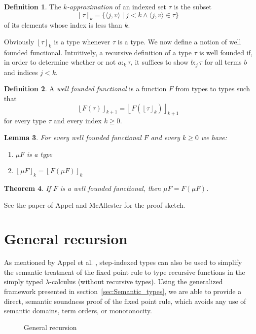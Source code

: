 \documentclass[10pt,a4paper,final,twocolumn]{article}
\theoremstyle{definition}
\newtheorem{definition}{Definition}
\theoremstyle{plain}
\newtheorem{lemma}[definition]{Lemma}
\newtheorem{theorem}[definition]{Theorem}
\newcommand{\app}[2]{\ensuremath{{#1}\,{#2}}}
\newcommand{\fix}[1]{\ensuremath{\mathsf{fix}\,{#1}}}
\newcommand{\pair}[1]{\ensuremath{\langle{#1}\rangle}}
\newcommand{\floor}[1]{\ensuremath{\left\lfloor{#1}\right\rfloor}}
\begin{document}
\begin{definition} \label{def:Approximation}
  The \emph{$k$-approximation} of an indexed set $\tau$ is the subset
  \[ \floor{\tau}_k = \{ \pair{j,v} \mid j < k \wedge \pair{j,v} \in \tau \} \]
  of its elements whose index is less than $k$.
\end{definition}

Obviously $\floor{\tau}_k$ is a type whenever $\tau$ is a type. We now define a notion of well founded
functional. Intuitively, a recursive definition of a type $\tau$ is well founded if, in order to determine
whether or not \mbox{$a :_k \tau$}, it suffices to show \mbox{$b :_j \tau$} for all terms $b$ and indices
\mbox{$j < k$}.

\begin{definition}
  A \emph{well founded functional} is a function $F$ from types to types such that
  \[\floor{F\left(\tau\right)}_{k+1} = \floor{F\left(\floor{\tau}_k\right)}_{k+1}\]
  for every type $\tau$ and every index $k \ge 0$.
\end{definition}

\begin{lemma}
  For every well founded functional $F$ and every $k \ge 0$ we have:
  \begin{enumerate}
  \item $\mu F$ is a type
  \item $\floor{\mu F}_k = \floor{F \left(\mu F\right)}_k$
  \end{enumerate}
\end{lemma}

\begin{theorem} \label{thm:Well_founded_fixpoint}
  If $F$ is a well founded functional, then $\mu F = F(\mu F)$.
\end{theorem}

See the paper of Appel and McAllester \cite{Appel01} for the proof sketch.


\section{General recursion}
\label{sec:General_recursion}


As mentioned by Appel et al. \cite{Appel01}, step-indexed types can also be used to simplify the semantic treatment
of the fixed point rule to type recursive functions in the simply typed $\lambda$-calculus (without recursive types).
Using the generalized framework presented in section~\ref{sec:Semantic_types}, we are able to provide a direct,
semantic soundness proof of the fixed point rule, which avoids any use of semantic domains, term orders, or
monotonocity.
\begin{figure}[tbh]
  \centering
  \caption{General recursion}
  \label{fig:General_recursion}
\end{figure}
\end{document}
